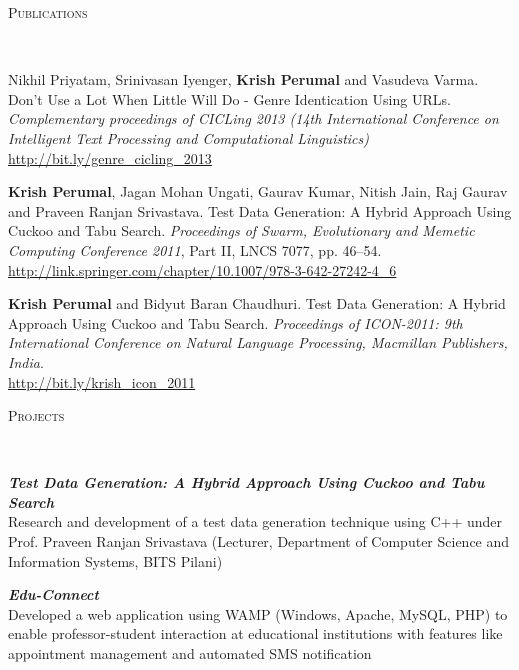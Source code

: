 \documentclass[9pt]{article}
\newenvironment{changemargin}[2]{%
  \begin{list}{}{%
    \setlength{\topsep}{0pt}%
    \setlength{\leftmargin}{#1}%
    \setlength{\rightmargin}{#2}%
    \setlength{\listparindent}{\parindent}%
    \setlength{\itemindent}{\parindent}%
    \setlength{\parsep}{\parskip}%
  }%
  \item[]}{\end{list}
}
\newcommand{\lineover}{
	\begin{changemargin}{-0.05in}{-0.05in}
		\vspace*{-8pt}
		\hrulefill \\
		\vspace*{-2pt}
	\end{changemargin}
}
\newcommand{\header}[1]{
	\begin{changemargin}{-0.5in}{-0.5in}
		\scshape{#1}\\
  	\lineover
	\end{changemargin}
}
\newenvironment{body} {
	\vspace*{-16pt}
	\begin{changemargin}{-0.25in}{-0.5in}
  }	
	{\end{changemargin}
}
\begin{document}
\smallskip


\header{Publications}

\begin{body}
	\vspace{14pt}
	Nikhil Priyatam, Srinivasan Iyenger, \textbf{Krish Perumal} and Vasudeva Varma. Don't Use a Lot When Little Will Do - Genre Identication Using URLs. 
\emph{Complementary proceedings of CICLing 2013 (14th International Conference on Intelligent Text Processing and Computational Linguistics)} \\ \url{http://bit.ly/genre_cicling_2013}
	
	\medskip
	
	\textbf{Krish Perumal}, Jagan Mohan Ungati, Gaurav Kumar, Nitish Jain, Raj Gaurav and Praveen Ranjan Srivastava. Test Data Generation: A Hybrid Approach Using Cuckoo and Tabu Search. \emph{Proceedings of Swarm, Evolutionary and Memetic Computing Conference 2011}, Part II, LNCS 7077, pp. 46–54. \\ \url{http://link.springer.com/chapter/10.1007/978-3-642-27242-4_6}
	
	\medskip
	
	\textbf{Krish Perumal} and Bidyut Baran Chaudhuri. Test Data Generation: A Hybrid Approach Using Cuckoo and Tabu Search. \emph{Proceedings of ICON-2011: 9th International Conference on Natural Language Processing, Macmillan Publishers, India}. \\
	\url{http://bit.ly/krish_icon_2011}
\end{body}

\newpage{}

\header{Projects}

\begin{body}
	\vspace{14pt}
	\emph{\textbf{Test Data Generation: A Hybrid Approach Using Cuckoo and Tabu Search}} \\
	Research and development of a test data generation technique using C++ under Prof. Praveen Ranjan Srivastava (Lecturer, Department of Computer
Science and Information Systems, BITS Pilani)
	
	\medskip
	
	\emph{\textbf{Edu-Connect}} \\
	Developed a web application using WAMP (Windows, Apache, MySQL, PHP) to enable professor-student
interaction at educational institutions with features like appointment management and automated
SMS notification

\end{body}
\end{document}
